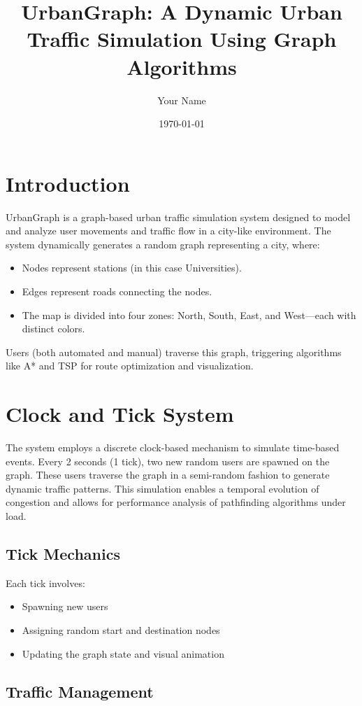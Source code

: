 \documentclass[12pt]{article}
\title{UrbanGraph: A Dynamic Urban Traffic Simulation Using Graph Algorithms}
\author{Your Name}
\date{\today}
\begin{document}
\maketitle
\tableofcontents
\newpage

\section{Introduction}
UrbanGraph is a graph-based urban traffic simulation system designed to model and analyze user movements and traffic flow in a city-like environment. The system dynamically generates a random graph representing a city, where:
\begin{itemize}
    \item Nodes represent stations (in this case Universities).
    \item Edges represent roads connecting the nodes.
    \item The map is divided into four zones: North, South, East, and West—each with distinct colors.
\end{itemize}
Users (both automated and manual) traverse this graph, triggering algorithms like A* and TSP for route optimization and visualization.

\section{Clock and Tick System}
The system employs a discrete clock-based mechanism to simulate time-based events. Every 2 seconds (1 tick), two new random users are spawned on the graph. These users traverse the graph in a semi-random fashion to generate dynamic traffic patterns. This simulation enables a temporal evolution of congestion and allows for performance analysis of pathfinding algorithms under load.

\subsection{Tick Mechanics}
Each tick involves:
\begin{itemize}
    \item Spawning new users
    \item Assigning random start and destination nodes
    \item Updating the graph state and visual animation
\end{itemize}

\subsection{Traffic Management}
\end{document}
